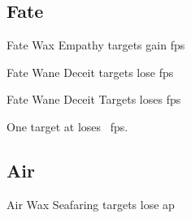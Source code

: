 \begin{multicols}{2}

\subsection{Fate}

  {Fate}%
  {Wax}%
  {\duplicated}%
  {Empathy}%
  { targets gain  \glspl{fp}}%

  {Fate}%
  {Wane}%
  {\duplicated}%
  {Deceit}%
  { targets lose  \glspl{fp}}%

  {Fate}%
  {Wane}%
  {\distant}%
  {Deceit}%
  {Targets loses  \glspl{fp}}%

One target at \spellRange{} loses ~\glspl{fp}.

\subsection{Air}

  {Air}%
  {Wax}%
  {\duplicated}%
  {Seafaring}%
  { targets lose  \gls{ap}}%

\end{multicols}

